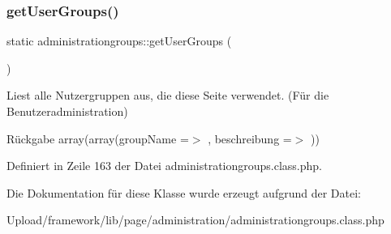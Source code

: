 \subsubsection{\texorpdfstring{get\+User\+Groups()}{getUserGroups()}}
{\footnotesize\ttfamily static administrationgroups\+::get\+User\+Groups (\begin{DoxyParamCaption}{ }\end{DoxyParamCaption})\hspace{0.3cm}{\ttfamily [static]}}

Liest alle Nutzergruppen aus, die diese Seite verwendet. (Für die Benutzeradministration) \begin{DoxyReturn}{Rückgabe}
array(array(\textquotesingle{}group\+Name\textquotesingle{} =$>$ \textquotesingle{}\textquotesingle{}, \textquotesingle{}beschreibung\textquotesingle{} =$>$ \textquotesingle{}\textquotesingle{})) 
\end{DoxyReturn}


Definiert in Zeile 163 der Datei administrationgroups.\+class.\+php.



Die Dokumentation für diese Klasse wurde erzeugt aufgrund der Datei\+:\begin{DoxyCompactItemize}
\item 
Upload/framework/lib/page/administration/administrationgroups.\+class.\+php\end{DoxyCompactItemize}
